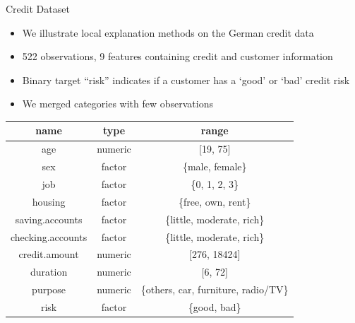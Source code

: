 \documentclass[10pt,compress,t,notes=noshow, xcolor=table]{beamer}
\begin{document}
\begin{frame}{Credit Dataset}

	\begin{itemize}
		\item We illustrate local explanation methods on the German credit data 
		\item 522 observations, 9 features containing credit and customer information
		\item Binary target ``risk'' indicates if a customer has a `good' or `bad' credit risk
		\item We merged categories with few observations 
	\end{itemize}
		\begin{center}
			\footnotesize
			\begin{tabular}{ccc}
				\toprule
				name & type & range\\
				\midrule
				age & numeric & [19, 75]\\
				sex & factor & \{male, female\}\\
				job & factor & \{0, 1, 2, 3\}\\
				housing & factor & \{free, own, rent\}\\
				saving.accounts & factor & \{little, moderate, rich\}\\
				checking.accounts & factor & \{little, moderate, rich\}\\
				credit.amount & numeric & [276, 18424]\\
				duration & numeric &  [6, 72]\\
				purpose & numeric &  \{others, car, furniture, radio/TV\}\\
				risk & factor & \{good, bad\}\\
				\bottomrule
			\end{tabular}
		\end{center}
\end{frame}

\endlecture
\end{document}
